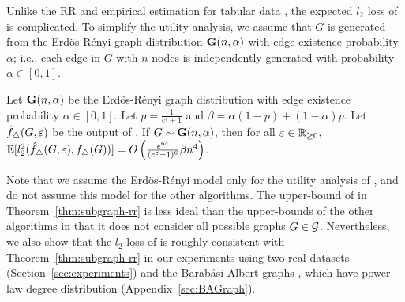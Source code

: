 Unlike the RR and empirical estimation for tabular data \cite{Kairouz_ICML16}, the expected $l_2$ loss of  is complicated. 
To simplify the utility analysis, we assume that $G$ is generated from the Erd\"os-R\'enyi graph distribution $\mathbf{G}(n,\alpha)$ with edge existence probability $\alpha$; i.e., each edge in $G$ with $n$ nodes is independently generated with probability $\alpha \in [0,1]$.

\begin{theorem}\label{thm:subgraph-rr}
  Let $\mathbf{G}(n,\alpha)$ be the Erd\"os-R\'enyi graph distribution with edge existence probability $\alpha \in [0,1]$. 
  Let $p = \frac{1}{e^\epsilon+1}$ and 
  $\beta = \alpha(1-p) + (1-\alpha)p$. 
  Let 
  $\hat{f}_{\triangle}(G, \varepsilon)$ 
  be the output of 
  .
  If 
  $G \sim \mathbf{G}(n,\alpha)$, 
  then for all 
  $\varepsilon \in \mathbb{R}_{\ge0}$, 
  $\mathbb{E}[l_2^2(\hat{f}_{\triangle}(G, \varepsilon),
  f_\triangle(G))] = 
  O\left(\frac{e^{6\varepsilon}}{(e^\varepsilon-1)^6}\beta n^4\right)$.
\end{theorem}


Note that we assume the Erd\"os-R\'enyi model only for the utility analysis of , and do not assume this model for the other algorithms. 
The upper-bound of  in Theorem~\ref{thm:subgraph-rr} is less ideal than the upper-bounds of the other algorithms in that it does not consider all possible graphs $G \in \mathcal{G}$. 
Nevertheless, we also show that the $l_2$ loss of  is roughly consistent with Theorem~\ref{thm:subgraph-rr} in our experiments using two real datasets (Section~\ref{sec:experiments}) and 
the Barab\'{a}si-Albert graphs \cite{NetworkScience}, which have power-law degree distribution (Appendix~\ref{sec:BAGraph}). 

